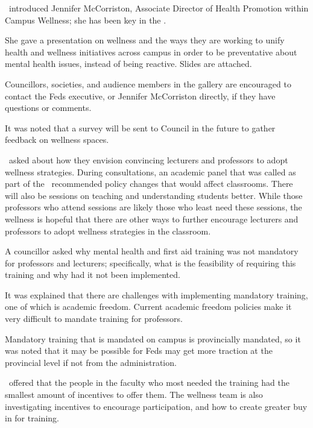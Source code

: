 \begin{information}
    \pres\ introduced Jennifer McCorriston, Associate Director of Health
    Promotion within Campus Wellness; she has been key in the \pacsmh.

    She gave a presentation on wellness and the ways they are working to 
    unify health and wellness initiatives across campus in order to be
    preventative about mental health issues, instead of being reactive. Slides
    are attached.

    Councillors, societies, and audience members in the gallery are encouraged
    to contact the Feds executive, or Jennifer McCorriston directly, if they
    have questions or comments.

    It was noted that a survey will be sent to Council in the future to gather
    feedback on wellness spaces.

    \austin\ asked about how they envision convincing lecturers and 
    professors to adopt wellness strategies. During consultations, an academic
    panel that was called as part of the \pacsmh\ recommended policy
    changes that would affect classrooms. There will also be sessions on
    teaching and understanding students better. While those professors who
    attend sessions are likely those who least need these sessions, the 
    wellness is hopeful that there are other ways to further encourage 
    lecturers and professors to adopt wellness strategies in the classroom.

    A councillor asked why mental health and first aid training was not
    mandatory for professors and lecturers; specifically, what is the
    feasibility of requiring this training and why had it not been implemented.

    It was explained that there are challenges with implementing mandatory 
    training, one of which is academic freedom. Current academic freedom
    policies make it very difficult to mandate training for professors.

    Mandatory training that is mandated on campus is provincially mandated,
    so it was noted that it may be possible for Feds may get more traction
    at the provincial level if not from the administration. 
    
    \katie\ offered that the people in the faculty who most needed the
    training had the smallest amount of incentives to offer them.  The
    wellness team is also investigating incentives to encourage participation,
    and how to create greater buy in for training.  


\end{information}
